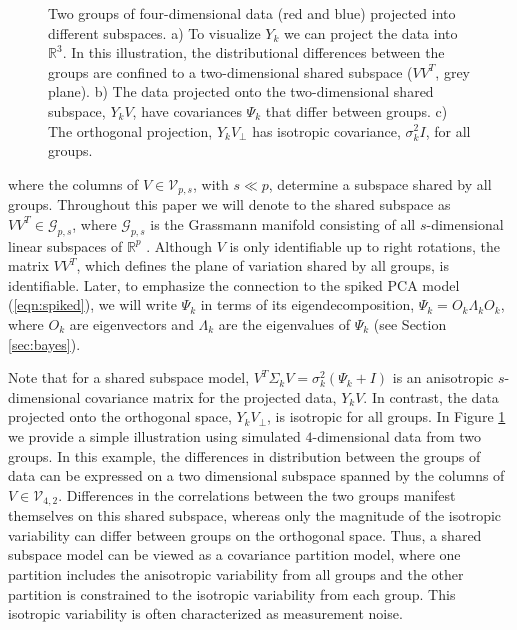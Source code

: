 \documentclass{statsoc}
\begin{document}
\begin{figure}[t]
    \centering
\quad
\quad 
{}
\caption{ Two groups of four-dimensional data (red and blue)
      projected into different subspaces.  a) To visualize $Y_k$ we
      can project the data into $\mathbb{R}^3$.  In this illustration, the
      distributional differences between the groups are confined to a
      two-dimensional shared subspace ($VV^T$, grey plane).  b) The
      data projected onto the two-dimensional shared subspace,
      $Y_kV$, have covariances $\Psi_k$ that differ between
      groups. c) The orthogonal projection, $Y_kV_{\perp}$
      has isotropic covariance, $\sigma_k^2I$, for all groups.  }
\label{fig:shared}
\end{figure}

%
\noindent where the columns of $V \in \mathcal{V}_{p, s}$, with
$s \ll p$, determine a subspace shared by all groups.  Throughout this
paper we will denote to the shared subspace as
$VV^T \in \mathcal G_{p,s}$, where $\mathcal G_{p,s}$ is the
Grassmann manifold consisting of all $s$-dimensional linear subspaces
of $\mathbb{R}^p$ \citep{Chikuse2012}.  Although $V$ is only
identifiable up to right rotations, the matrix $VV^T$, which defines
the plane of variation shared by all groups, is identifiable.  Later,
to emphasize the connection to the spiked PCA model
(\ref{eqn:spiked}), we will write $\Psi_k$ in terms of its
eigendecomposition, $\Psi_k = O_k\Lambda_kO_k$, where $O_k$ are
eigenvectors and $\Lambda_k$ are the eigenvalues of $\Psi_k$ (see
Section \ref{sec:bayes}).

Note that for a shared subspace model,
$V^T\Sigma_kV = \sigma_k^2(\Psi_k + I)$ is an anisotropic
$s$-dimensional covariance matrix for the projected data, $Y_kV$.  In
contrast, the data projected onto the orthogonal space,
$Y_kV_{\perp}$, is isotropic for all groups.  In Figure
\ref{fig:shared} we provide a simple illustration using simulated
$4$-dimensional data from two groups.  In this example, the
differences in distribution between the groups of data can be
expressed on a two dimensional subspace spanned by the columns of
$V \in \mathcal{V}_{4, 2}$.  Differences in the correlations between
the two groups manifest themselves on this shared subspace, whereas
only the magnitude of the isotropic variability can differ between
groups on the orthogonal space.  Thus, a shared subspace model
can be viewed as a covariance partition model, where one partition
includes the anisotropic variability from all groups and the other
partition is constrained to the isotropic variability from each group.
This isotropic variability is often characterized as measurement
noise.
\end{document}
